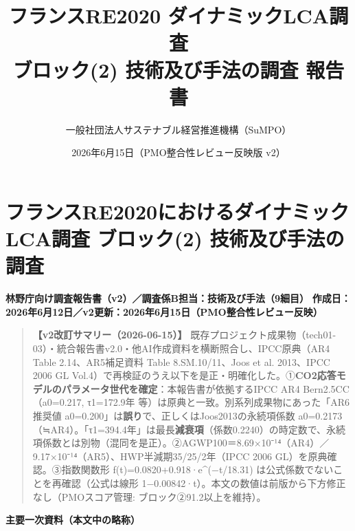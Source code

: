 \documentclass[11pt]{ltjsarticle}
\title{フランスRE2020 ダイナミックLCA調査\\ブロック(2) 技術及び手法の調査 報告書}
\author{一般社団法人サステナブル経営推進機構（SuMPO）}
\date{2026年6月15日（PMO整合性レビュー反映版 v2）}
\begin{document}
\maketitle

\hypertarget{ux30d5ux30e9ux30f3ux30b9re2020ux306bux304aux3051ux308bux30c0ux30a4ux30caux30dfux30c3ux30aflcaux8abfux67fb-ux30d6ux30edux30c3ux30af2-ux6280ux8853ux53caux3073ux624bux6cd5ux306eux8abfux67fb}{%
\section{フランスRE2020におけるダイナミックLCA調査 ブロック(2)
技術及び手法の調査}\label{ux30d5ux30e9ux30f3ux30b9re2020ux306bux304aux3051ux308bux30c0ux30a4ux30caux30dfux30c3ux30aflcaux8abfux67fb-ux30d6ux30edux30c3ux30af2-ux6280ux8853ux53caux3073ux624bux6cd5ux306eux8abfux67fb}}

\textbf{林野庁向け調査報告書（v2）／調査係B担当：技術及び手法（9細目）}
\textbf{作成日：2026年6月12日／v2更新：2026年6月15日（PMO整合性レビュー反映）}

\begin{quote}
\textbf{【v2改訂サマリー（2026-06-15）】}
既存プロジェクト成果物（tech01-03）・統合報告書v2.0・他AI作成資料を横断照合し、IPCC原典（AR4
Table 2.14、AR5補足資料 Table 8.SM.10/11、Joos et al. 2013、IPCC 2006 GL
Vol.4）で再検証のうえ以下を是正・明確化した。①\textbf{CO2応答モデルのパラメータ世代を確定}：本報告書が依拠するIPCC
AR4 Bern2.5CC（a0=0.217, τ1=172.9年
等）は原典と一致。別系列成果物にあった「AR6推奨値
a0=0.200」は\textbf{誤り}で、正しくはJoos2013の永続項係数
a0=0.2173（≒AR4）。「τ1=394.4年」は最長\textbf{減衰項}（係数0.2240）の時定数で、永続項係数とは別物（混同を是正）。②AGWP100＝8.69×10⁻¹⁴（AR4）／9.17×10⁻¹⁴（AR5）、HWP半減期35/25/2年（IPCC
2006 GL）を原典確認。③指数関数形 f(t)=0.0820+0.918·e\^{}(−t/18.31)
は公式係数でないことを再確認（公式は線形
1−0.00842·t）。本文の数値は前版から下方修正なし（PMOスコア管理:
ブロック②91.2以上を維持）。
\end{quote}

\textbf{主要一次資料（本文中の略称）}
\end{document}
